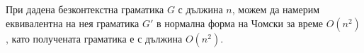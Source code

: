 \begin{thm}
  При дадена безконтекстна граматика $G$ с дължина $n$, можем да намерим еквивалентна
  на нея граматика $G'$ в нормална форма на Чомски за време $O(n^2)$,
  като получената граматика е с дължина $O(n^2)$.
\end{thm}



